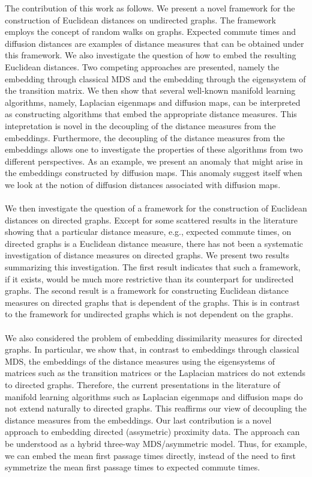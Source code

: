 The contribution of this work as follows. We present a novel framework
for the construction of Euclidean distances on undirected graphs. The
framework employs the concept of random walks on graphs. Expected
commute times and diffusion distances are examples of distance
measures that can be obtained under this framework. We also
investigate the question of how to embed the resulting Euclidean
distances. Two competing approaches are presented, namely the
embedding through classical MDS and the embedding through the
eigensystem of the transition matrix. We then show that several
well-known manifold learning algorithms, namely, Laplacian eigenmaps
and diffusion maps, can be interpreted as constructing algorithms that
embed the appropriate distance measures. This intepretation is novel
in the decoupling of the distance measures from the
embeddings. Furthermore, the decoupling of the distance measures from
the embeddings allows one to investigate the properties of these
algorithms from two different perspectives. As an example, we present
an anomaly that might arise in the embeddings constructed by diffusion
maps. This anomaly suggest itself when we look at the notion of
diffusion distances associated with diffusion maps. \\ \\
%
\noindent We then investigate the question of a framework for the construction
of Euclidean distances on directed graphs. Except for some scattered
results in the literature showing that a particular distance measure,
e.g., expected commute times, on directed graphs is a Euclidean
distance measure, there has not been a systematic investigation of
distance measures on directed graphs. We present two results
summarizing this investigation. The first result indicates that such a
framework, if it exists, would be much more restrictive than its
counterpart for undirected graphs. The second result is a framework
for constructing Euclidean distance measures on directed graphs that
is dependent of the graphs. This is in contrast to the framework for
undirected graphs which is not dependent on the graphs. \\ \\
%
\noindent We also considered the problem of embedding dissimilarity measures for
directed graphs. In particular, we show that, in contrast to
embeddings through classical MDS, the embeddings of the distance
measures using the eigensystems of matrices such as the transition
matrices or the Laplacian matrices do not extends to directed
graphs. Therefore, the current presentations in the literature of
manifold learning algorithms such as Laplacian eigenmaps and diffusion
maps do not extend naturally to directed graphs. This reaffirms our
view of decoupling the distance measures from the embeddings. Our last
contribution is a novel approach to embedding directed (assymetric)
proximity data. The approach can be understood as a hybrid three-way
MDS/asymmetric model. Thus, for example, we can embed the mean first
passage times directly, instead of the need to first symmetrize the
mean first passage times to expected commute times.

